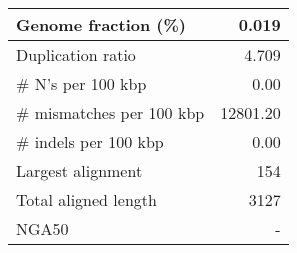 \documentclass[12pt,a4paper]{article}
\begin{document}
\begin{table}[ht]
\begin{center}
\begin{tabular}{|l*{1}{|r}|}
Genome fraction (\%) & 0.019 \\ \hline
Duplication ratio & 4.709 \\ \hline
\# N's per 100 kbp & 0.00 \\ \hline
\# mismatches per 100 kbp & 12801.20 \\ \hline
\# indels per 100 kbp & 0.00 \\ \hline
Largest alignment & 154 \\ \hline
Total aligned length & 3127 \\ \hline
NGA50 & - \\ \hline
\end{tabular}
\end{center}
\end{table}
\end{document}
